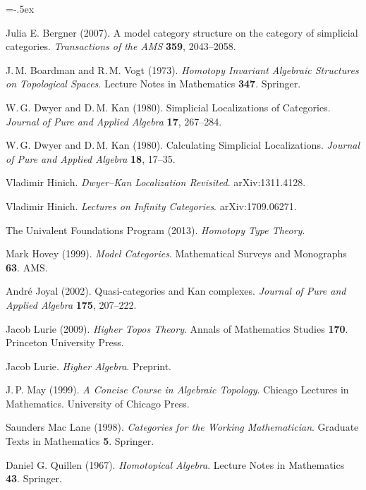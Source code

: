 \small
\begin{thebibliography}{MMMM}
    \itemsep=-.5ex
    
     Julia E. Bergner (2007).
    A model category structure on the category of simplicial categories.
    \emph{Transactions of the AMS} \textbf{359}, 2043--2058.

     J.\,M. Boardman and R.\,M. Vogt (1973).
    \emph{Homotopy Invariant Algebraic Structures on Topological Spaces}.
    Lecture Notes in Mathematics \textbf{347}. Springer.

     W.\,G. Dwyer and D.\,M. Kan (1980).
    Simplicial Localizations of Categories.
    \emph{Journal of Pure and Applied Algebra} \textbf{17}, 267--284.

     W.\,G. Dwyer and D.\,M. Kan (1980).
    Calculating Simplicial Localizations.
    \emph{Journal of Pure and Applied Algebra} \textbf{18}, 17--35.

     Vladimir Hinich.
    \emph{Dwyer--Kan Localization Revisited}. arXiv:1311.4128.

     Vladimir Hinich.
    \emph{Lectures on Infinity Categories}. arXiv:1709.06271.

     The Univalent Foundations Program (2013).
    \emph{Homotopy Type Theory}.

     Mark Hovey (1999).
    \emph{Model Categories}. 
    Mathematical Surveys and Monographs \textbf{63}. AMS.

     André Joyal (2002).
    Quasi-categories and Kan complexes.
    \emph{Journal of Pure and Applied Algebra} \textbf{175}, 207--222.

     Jacob Lurie (2009).
    \emph{Higher Topos Theory}. 
    Annals of Mathematics Studies \textbf{170}. Princeton University Press.

     Jacob Lurie.
    \emph{Higher Algebra}. Preprint.

     J.\,P. May (1999).
    \emph{A Concise Course in Algebraic Topology}.
    Chicago Lectures in Mathematics.
    University of Chicago Press.

     Saunders Mac Lane (1998).
    \emph{Categories for the Working Mathematician}.
    Graduate Texts in Mathematics \textbf{5}. Springer.

     Daniel G. Quillen (1967).
    \emph{Homotopical Algebra}.
    Lecture Notes in Mathematics \textbf{43}. Springer.


\end{thebibliography}
